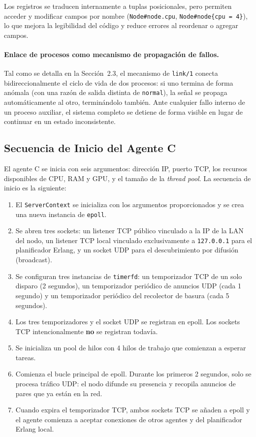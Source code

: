 \documentclass[12pt,a4paper]{article}
\begin{document}
Los registros se traducen internamente a tuplas posicionales, pero permiten acceder y modificar campos por nombre (\texttt{Node\#node.cpu}, \texttt{Node\#node\{cpu = 4\}}), lo que mejora la legibilidad del código y reduce errores al reordenar o agregar campos.
 
\paragraph{Enlace de procesos como mecanismo de propagación de fallos.}
Tal como se detalla en la Sección~2.3, el mecanismo de \texttt{link/1} conecta bidireccionalmente el ciclo de vida de dos procesos: si uno termina de forma anómala (con una razón de salida distinta de \texttt{normal}), la señal se propaga automáticamente al otro, terminándolo también. Ante cualquier fallo interno de un proceso auxiliar, el sistema completo se detiene de forma visible en lugar de continuar en un estado inconsistente.

\subsection{Secuencia de Inicio del Agente C}

El agente C se inicia con seis argumentos: dirección IP, puerto TCP, los recursos disponibles de CPU, RAM y GPU, y el tamaño de la \emph{thread pool}. La secuencia de inicio es la siguiente:

\begin{enumerate}
    \item El \texttt{ServerContext} se inicializa con los argumentos proporcionados y se crea una nueva instancia de \texttt{epoll}.
    \item Se abren tres sockets: un listener TCP público vinculado a la IP de la LAN del nodo, un listener TCP local vinculado exclusivamente a \texttt{127.0.0.1} para el planificador Erlang, y un socket UDP para el descubrimiento por difusión (broadcast).
    \item Se configuran tres instancias de \texttt{timerfd}: un temporizador TCP de un solo disparo (2 segundos), un temporizador periódico de anuncios UDP (cada 1 segundo) y un temporizador periódico del recolector de basura (cada 5 segundos).
    \item Los tres temporizadores y el socket UDP se registran en epoll. Los sockets TCP intencionalmente \textbf{no} se registran todavía.
    \item Se inicializa un pool de hilos con 4 hilos de trabajo que comienzan a esperar tareas.
    \item Comienza el bucle principal de epoll. Durante los primeros 2 segundos, solo se procesa tráfico UDP: el nodo difunde su presencia y recopila anuncios de pares que ya están en la red.
    \item Cuando expira el temporizador TCP, ambos sockets TCP se añaden a epoll y el agente comienza a aceptar conexiones de otros agentes y del planificador Erlang local.
\end{enumerate}
\end{document}
